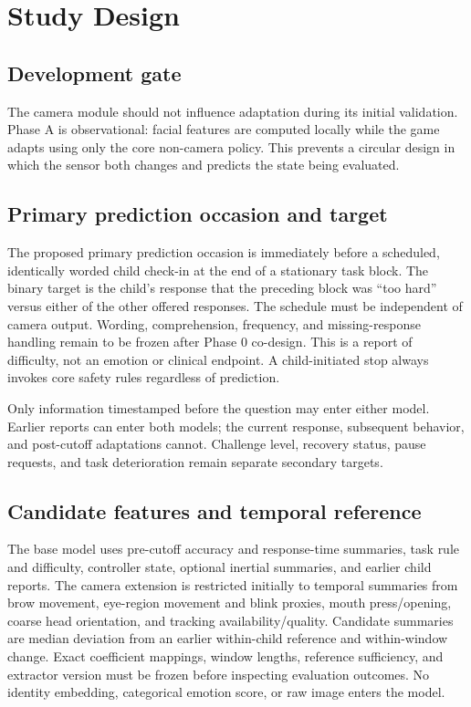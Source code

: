 \section{Study Design}

\subsection{Development gate}

The camera module should not influence adaptation during its initial validation. Phase A is observational: facial features are computed locally while the game adapts using only the core non-camera policy. This prevents a circular design in which the sensor both changes and predicts the state being evaluated.


\subsection{Primary prediction occasion and target}

The proposed primary prediction occasion is immediately before a scheduled, identically worded child check-in at the end of a stationary task block. The binary target is the child's response that the preceding block was \enquote{too hard} versus either of the other offered responses. The schedule must be independent of camera output. Wording, comprehension, frequency, and missing-response handling remain to be frozen after Phase 0 co-design. This is a report of difficulty, not an emotion or clinical endpoint. A child-initiated stop always invokes core safety rules regardless of prediction.

Only information timestamped before the question may enter either model. Earlier reports can enter both models; the current response, subsequent behavior, and post-cutoff adaptations cannot. Challenge level, recovery status, pause requests, and task deterioration remain separate secondary targets.

\subsection{Candidate features and temporal reference}

The base model uses pre-cutoff accuracy and response-time summaries, task rule and difficulty, controller state, optional inertial summaries, and earlier child reports. The camera extension is restricted initially to temporal summaries from brow movement, eye-region movement and blink proxies, mouth press/opening, coarse head orientation, and tracking availability/quality. Candidate summaries are median deviation from an earlier within-child reference and within-window change. Exact coefficient mappings, window lengths, reference sufficiency, and extractor version must be frozen before inspecting evaluation outcomes. No identity embedding, categorical emotion score, or raw image enters the model.

